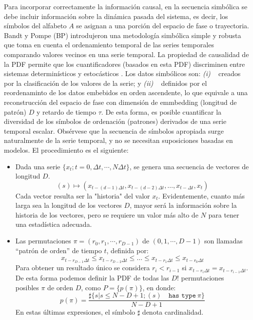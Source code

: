 Para incorporar correctamente la información causal, en la secuencia simbólica  se debe incluir  información sobre la dinámica pasada del sistema, es decir, los símbolos del alfabeto $A$ se asignan a una porción del espacio de fase o trayectoria.
Bandt y Pompe (BP) \cite{Bandt2002} introdujeron una metodología simbólica simple y robusta que toma en cuenta el ordenamiento temporal de las series temporales comparando valores vecinos en una serie temporal.
La propiedad de causalidad de la PDF permite que los cuantificadores (basados en esta PDF) discriminen entre sistemas determinísticos y estocásticos \cite{Rosso2007B}.
Los datos simbólicos son:
{\it (i) \/} ~ creados por la clasificación de los valores de la serie; y
{\it (ii) \/} ~ definidos por el reordenaminto de los datos embebidos en orden ascendente, lo que equivale a una reconstrucción del espacio de fase con dimensión de emmbedding (longitud de patrón) $D$ y retardo de tiempo $\tau$.
De esta forma, es posible cuantificar la diversidad de los símbolos de ordenación (patrones) derivados de una serie temporal escalar.
Obsérvese que la secuencia de símbolos apropiada surge naturalmente de la serie temporal, y no se necesitan suposiciones basadas en modelos.
El procedimiento es el siguiente:
\begin{itemize}
	\item Dada una serie $\{x_t; t=0, \Delta t, \cdots,N\Delta t \}$, se genera una secuencia de vectores de longitud $D$.
	\begin{equation}
	(s)\longmapsto\left(x_{t-(d-1)\Delta t},x_{t-(d-2)\Delta t},\dots,x_{t-\Delta t},x_{t}\right) 
	\label{eq:vectores}
	\end{equation}
	Cada vector resulta ser la "historia" del valor $x_t$. Evidentemente, cuanto más larga sea la longitud de los vectores $D$, mayor será la información sobre la historia de los vectores, pero se requiere un valor más alto de $N$ para tener una estadística adecuada.
	\item Las permutaciones $\pi=(r_0, r_1, \cdots, r_{D-1})$ de $(0, 1, \cdots, D-1)$ son llamadas ``patrón de orden'' de tiempo $t$, definida por:
	\begin{equation}
	\label{eq:permuta}
	x_{t-r_{D-1}\Delta t}\le x_{t-r_{D-2}\Delta t}\le\dots\le x_{t-r_{1}\Delta t}\le x_{t-r_0\Delta t}
	\end{equation}
	Para obtener un resultado único se considera $r_i<r_{i-1}$ si $x_{t-r_{i}\Delta t}=x_{t-r_{i-1}\Delta t}$.
	De esta forma podemos definir la PDF de todas las $D!$ permutaciones posibles $\pi$ de orden $D$, como $P=\{p(\pi)\}$, en donde:
	\begin{equation}
	\label{eq:frequ}
	p(\pi)=\frac{\sharp \{s|s\leq N-D+1; (s) \quad \texttt{has type}~\pi\}}{N-D+1}
	\end{equation}
	En estas últimas expresiones, el símbolo $\sharp$ denota cardinalidad.
\end{itemize}

